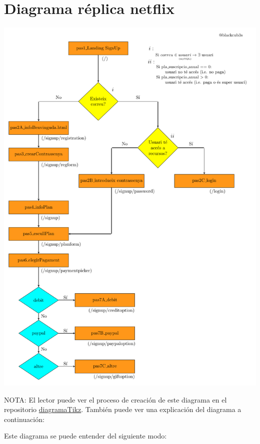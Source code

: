 \documentclass[a4paper,12pt]{report}
\begin{document}
			
		
		
		\section{Diagrama réplica netflix}
		\label{sec:anexo_diagramaNetflix}
		
		\includegraphics[width=1\textwidth]{img/diagramaTikzDefinitiuV2.pdf}

		NOTA: El lector puede ver el proceso de creación de este diagrama en el repositorio \href{https://github.com/blackcub3s/diagramaTikz}{diagramaTikz}. También puede ver una explicación del diagrama a continuación:
		
		Este diagrama se puede entender del siguiente modo:
		
\end{document}
